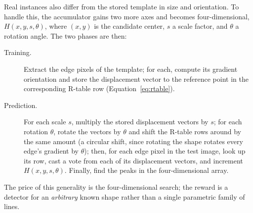 Real instances also differ from the stored template in size and orientation. To
handle this, the accumulator gains two more axes and becomes four-dimensional,
$H(x,y,s,\theta)$, where $(x,y)$ is the candidate center, $s$ a scale factor, and
$\theta$ a rotation angle. The two phases are then:
\begin{description}
  \item[Training.] Extract the edge pixels of the template; for each, compute its
    gradient orientation and store the displacement vector to the reference point
    in the corresponding R-table row (Equation~\eqref{eq:rtable}).
  \item[Prediction.] For each scale $s$, multiply the stored displacement vectors
    by $s$; for each rotation $\theta$, rotate the vectors by $\theta$ and shift
    the R-table rows around by the same amount (a circular shift, since rotating
    the shape rotates every edge's gradient by $\theta$); then, for each edge
    pixel in the test image, look up its row, cast a vote from each of its
    displacement vectors, and increment $H(x,y,s,\theta)$. Finally, find the peaks
    in the four-dimensional array.
\end{description}
\noindent
The price of this generality is the four-dimensional search; the reward is a
detector for an \emph{arbitrary} known shape rather than a single parametric
family of lines.

